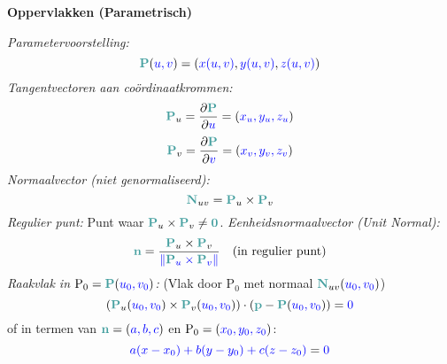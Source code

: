\documentclass[12pt]{article}
\renewcommand{\vec}[1]{\textcolor{vectorTeal}{\mathbf{#1}}}
\newcommand{\scalar}[1]{\textcolor{scalarBrightBlue}{#1}}
\newcommand{\punt}[1]{\mathrm{#1}}
\begin{document}
\vspace{1.5em} %
{\centering
\textcolor{headerBrown}{\large\textbf{Oppervlakken (Parametrisch)}}
\par
}%
\textit{Parametervoorstelling:}
\[
\vec{P}(\scalar{u, v}) = (\scalar{x(u,v)}, \scalar{y(u,v)}, \scalar{z(u,v)})
\]
\textit{Tangentvectoren aan coördinaatkrommen:}
\[
\vec{P}_u = \frac{\partial\vec{P}}{\partial\scalar{u}} = (\scalar{x_u, y_u, z_u})
\]
\[
\vec{P}_v = \frac{\partial\vec{P}}{\partial\scalar{v}} = (\scalar{x_v, y_v, z_v})
\]
\textit{Normaalvector (niet genormaliseerd):}
\[
\vec{N}_{uv} = \vec{P}_u \times \vec{P}_v
\]
\textit{Regulier punt:} Punt waar $\vec{P}_u \times \vec{P}_v \neq \vec{0}$.
\textit{Eenheidsnormaalvector (Unit Normal):}
\[
\vec{n} = \frac{\vec{P}_u \times \vec{P}_v}{\scalar{\|\vec{P}_u \times \vec{P}_v\|}} \quad (\text{in regulier punt})
\]
\textit{Raakvlak in $\punt{P_0} = \vec{P}(\scalar{u_0, v_0})$:} (Vlak door $\punt{P_0}$ met normaal $\vec{N}_{uv}(\scalar{u_0, v_0})$)
\[
(\vec{P}_u(\scalar{u_0, v_0}) \times \vec{P}_v(\scalar{u_0, v_0})) \cdot (\vec{p} - \vec{P}(\scalar{u_0, v_0})) = \scalar{0}
\]
of in termen van $\vec{n} = (\scalar{a,b,c})$ en $\punt{P_0} = (\scalar{x_0, y_0, z_0})$:
\[
\scalar{a(x-x_0) + b(y-y_0) + c(z-z_0)} = \scalar{0}
\]
\end{document}
